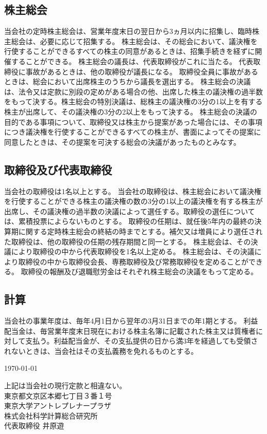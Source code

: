 \documentclass[11pt,a4paper]{jsarticle}
\begin{document}
\subsection{株主総会}
当会社の定時株主総会は、営業年度末日の翌日から3ヵ月以内に招集し、臨時株主総会は、必要に応じて招集する。
株主総会は、その総会において、議決権を行使することができるすべての株主の同意があるときは、招集手続きを経ずに開催することができる。
株主総会の議長は、代表取締役がこれに当たる。
\term 代表取締役に事故があるときは、他の取締役が議長になる。
\term 取締役全員に事故があるときは、総会において出席株主のうちから議長を選出する。
株主総会の決議は、法令又は定款に別段の定めがある場合の他、出席した株主の議決権の過半数をもって決する。株主総会の特別決議は、総株主の議決権の3分の1以上を有する株主が出席して、その議決権の3分の2以上をもって決する。
株主総会の決議の目的である事項について、取締役又は株主から提案があった場合には、その事項につき議決権を行使することができるすべての株主が、書面によってその提案に同意したときは、その提案を可決する総会の決議があったものとみなす。


\subsection{取締役及び代表取締役}
当会社の取締役は1名以上とする。
当会社の取締役は、株主総会において議決権を行使することができる株主の議決権の数の3分の1以上の議決権を有する株主が出席し、その議決権の過半数の決議によって選任する。取締役の選任については、累積投票によらないものとする。
取締役の任期は、就任後5年内の最終の決算期に関する定時株主総会の終結の時までとする。補欠又は増員により選任された取締役は、他の取締役の任期の残存期間と同一とする。
株主総会は、その決議により取締役の中から代表取締役を1名以上定める。 
\term 株主総会は、その決議により取締役の中から取締役会長、専務取締役及び常務取締役を定めることができる。
取締役の報酬及び退職慰労金はそれぞれ株主総会の決議をもって定める。


\subsection{計算}
当会社の事業年度は、毎年4月1日から翌年の3月31日までの年1期とする。
利益配当金は、毎営業年度末日現在における株主名簿に記載された株主又は質権者に対して支払う。利益配当金が、その支払提供の日から満3年を経過しても受領されないときは、当会社はその支払義務を免れるものとする。


\vspace{20pt}
\begin{flushright}
  \today
  \vspace{10pt}

  上記は当会社の現行定款と相違ない。\\
  \vspace{10pt}
  東京都文京区本郷七丁目３番１号\\
  東京大学アントレプレナープラザ\\
  株式会社科学計算総合研究所\\
  代表取締役 井原遊
\end{flushright}
\end{document}
